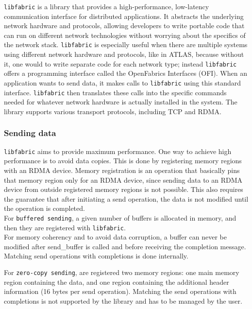 \texttt{libfabric} \cite{libfabric} is a library that provides a high-performance, low-latency communication interface for distributed applications. It abstracts the underlying network hardware and protocols, allowing developers to write portable code that can run on different network technologies without worrying about the specifics of the network stack. \texttt{libfabric} is especially useful when there are multiple systems using different network hardware and protocols, like in \acs{ATLAS}, because without it, one would to write separate code for each network type; instead \texttt{libfabric} offers a programming interface called the OpenFabrics Interfaces (OFI). When an application wants to send data, it makes calls to \texttt{libfabric} using this standard interface. \texttt{libfabric} then translates these calls into the specific commands needed for whatever network hardware is actually installed in the system. The library supports various transport protocols, including TCP and \acs{RDMA}.

\subsubsection{Sending data}

\texttt{libfabric} aims to provide maximum performance. One way to achieve high performance is to avoid data copies. This is done by registering memory regions with an \acs{RDMA} device. Memory registration is an operation that basically pins that memory region only for an \acs{RDMA} device, since sending data to an \acs{RDMA} device from outside registered memory regions is not possible. This also requires the guarantee that after initiating a send operation, the data is not modified until the operation is completed.\\

For \texttt{buffered sending}, a given number of buffers is allocated in memory, and then they are registered with \texttt{libfabric}.\\
For memory coherency and to avoid data corruption, a buffer can never be modified after send\_buffer is called and before receiving the completion message. Matching send operations with completions is done internally.

For \texttt{zero-copy sending}, are registered two memory regions: one main memory region containing the data, and one region containing the additional header information (16 bytes per send operation).  Matching the send operations with completions is not supported by the library and has to be managed by the user.

